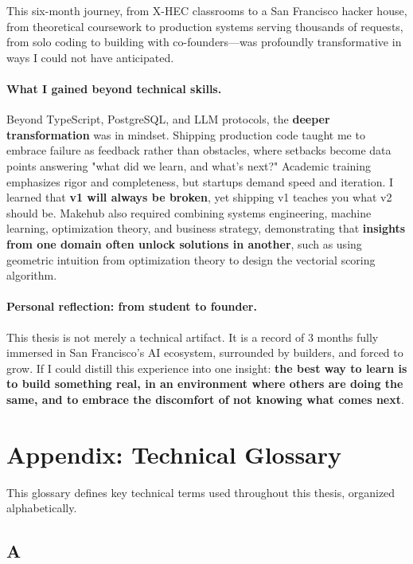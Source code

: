 \documentclass[english]{article}
\begin{document}
This six-month journey, from X-HEC classrooms to a San Francisco hacker house, from theoretical coursework to production systems serving thousands of requests, from solo coding to building with co-founders—was profoundly transformative in ways I could not have anticipated.

\paragraph{What I gained beyond technical skills.}

Beyond TypeScript, PostgreSQL, and LLM protocols, the \textbf{deeper transformation} was in mindset. Shipping production code taught me to embrace failure as feedback rather than obstacles, where setbacks become data points answering "what did we learn, and what's next?" Academic training emphasizes rigor and completeness, but startups demand speed and iteration. I learned that \textbf{v1 will always be broken}, yet shipping v1 teaches you what v2 should be. Makehub also required combining systems engineering, machine learning, optimization theory, and business strategy, demonstrating that \textbf{insights from one domain often unlock solutions in another}, such as using geometric intuition from optimization theory to design the vectorial scoring algorithm.

\paragraph{Personal reflection: from student to founder.}

This thesis is not merely a technical artifact. It is a record of 3 months fully immersed in San Francisco's AI ecosystem, surrounded by builders, and forced to grow. If I could distill this experience into one insight: \textbf{the best way to learn is to build something real, in an environment where others are doing the same, and to embrace the discomfort of not knowing what comes next}.


\newpage
\section*{Appendix: Technical Glossary}

This glossary defines key technical terms used throughout this thesis, organized alphabetically.

\subsection*{A}
\end{document}
